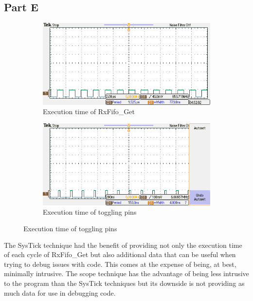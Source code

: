\documentclass{article}
\begin{document}
	\subsection{Part E}
		\centering
		\begin{figure}[h]
			\centering
			\begin{subfigure}{0.45\textwidth}
				\includegraphics[keepaspectratio, width=\textwidth]{Lab2Screens/Lab2PartE1}
				\caption{Execution time of RxFifo\_Get}
				\label{fig:SS_E1}
			\end{subfigure}
			\hfill
			\begin{subfigure}{0.45\textwidth}
				\includegraphics[keepaspectratio, width=\textwidth]{Lab2Screens/Lab2PartE2}
				\caption{Execution time of toggling pins}
				\label{fig:SS_E2}
			\end{subfigure}
			\label{fig:SS_E}
			\hfill
		\end{figure}
		\raggedright
		The SysTick technique had the benefit of providing not only the execution time of each cycle of RxFifo\_Get but also additional data that can be useful when trying to debug issues with code. This comes at the expense of being, at best, minimally intrusive. The scope technique has the advantage of being less intrusive to the program than the SysTick techniques but its downside is not providing as much data for use in debugging code.
		
\end{document}
